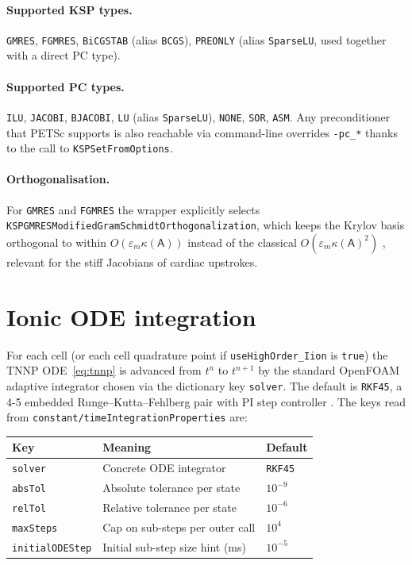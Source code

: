 \documentclass[11pt,a4paper]{article}
\newcommand{\Aimp}{\mathsf{A}}
\newcommand{\code}[1]{\texttt{\small #1}}
\begin{document}
\paragraph{Supported KSP types.} \code{GMRES}, \code{FGMRES},
\code{BiCGSTAB} (alias \code{BCGS}), \code{PREONLY} (alias
\code{SparseLU}, used together with a direct PC type).

\paragraph{Supported PC types.} \code{ILU}, \code{JACOBI},
\code{BJACOBI}, \code{LU} (alias \code{SparseLU}), \code{NONE},
\code{SOR}, \code{ASM}. Any preconditioner that PETSc supports is
also reachable via command-line overrides \code{-pc\_*} thanks to the
call to \code{KSPSetFromOptions}.

\paragraph{Orthogonalisation.} For \code{GMRES} and \code{FGMRES} the
wrapper explicitly selects \code{KSPGMRESModifiedGramSchmidtOrthogonalization},
which keeps the Krylov basis orthogonal to within $O(\varepsilon_{m} \kappa(\Aimp))$
instead of the classical $O(\varepsilon_{m} \kappa(\Aimp)^{2})$ \cite{saadbook},
relevant for the stiff Jacobians of cardiac upstrokes.

\section{Ionic ODE integration}

For each cell (or each cell quadrature point if \code{useHighOrder\_Iion}
is \code{true}) the TNNP ODE~\eqref{eq:tnnp} is advanced from $t^{n}$
to $t^{n+1}$ by the standard OpenFOAM adaptive integrator chosen via
the dictionary key \code{solver}. The default is \code{RKF45}, a 4-5
embedded Runge--Kutta--Fehlberg pair with PI step controller
\cite{hairer2}. The keys read from
\code{constant/timeIntegrationProperties} are:
\begin{center}
\begin{tabular}{@{}lll@{}}
\toprule
Key & Meaning & Default \\
\midrule
\code{solver} & Concrete ODE integrator & \code{RKF45} \\
\code{absTol} & Absolute tolerance per state & $10^{-9}$ \\
\code{relTol} & Relative tolerance per state & $10^{-6}$ \\
\code{maxSteps} & Cap on sub-steps per outer call & $10^{4}$ \\
\code{initialODEStep} & Initial sub-step size hint (ms) & $10^{-5}$ \\
\bottomrule
\end{tabular}
\end{center}
\end{document}
